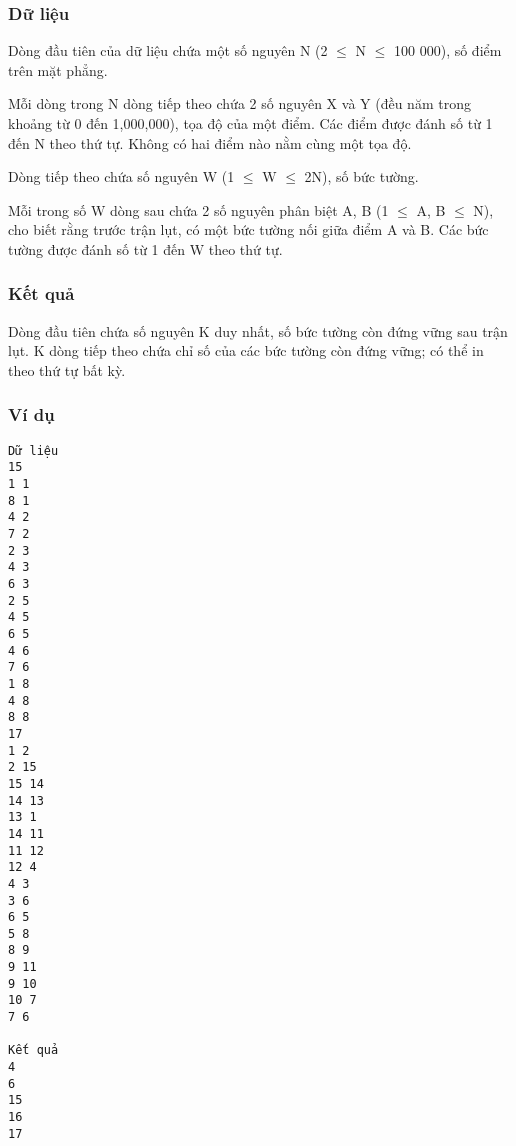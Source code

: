 \subsubsection{   Dữ liệu  }

   Dòng đầu tiên của dữ liệu chứa một số nguyên N (2  $\le$  N  $\le$  100 000), số điểm trên mặt phẳng.  

   Mỗi dòng trong N dòng tiếp theo chứa 2 số nguyên X và Y (đều năm trong khoảng từ 0 đến 1,000,000), tọa độ của một điểm. Các điểm được đánh số từ 1 đến N theo thứ tự. Không có hai điểm nào nằm cùng một tọa độ.  

   Dòng tiếp theo chứa số nguyên W (1  $\le$  W  $\le$  2N), số bức tường.  

   Mỗi trong số W dòng sau chứa 2 số nguyên phân biệt A, B (1  $\le$  A, B  $\le$  N), cho biết rằng trước trận lụt, có một bức tường nối giữa điểm A và B. Các bức tường được đánh số từ 1 đến W theo thứ tự.  

\subsubsection{   Kết quả  }

   Dòng đầu tiên chứa số nguyên K duy nhất, số bức tường còn đứng vững sau trận lụt. K dòng tiếp theo chứa chỉ số của các bức tường còn đứng vững; có thể in theo thứ tự bất kỳ.  

\subsubsection{   Ví dụ  }
\begin{verbatim}
Dữ liệu
15
1 1
8 1
4 2
7 2
2 3
4 3
6 3
2 5
4 5
6 5
4 6
7 6
1 8
4 8
8 8
17
1 2
2 15
15 14
14 13
13 1
14 11
11 12
12 4
4 3
3 6
6 5
5 8
8 9
9 11
9 10
10 7
7 6

Kết quả
4
6
15
16
17
\end{verbatim}
